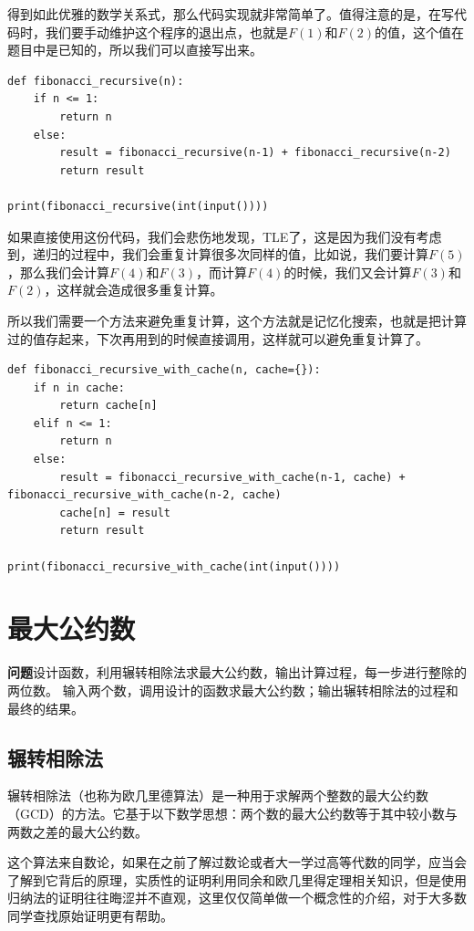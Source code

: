 \documentclass{article}
\begin{document}
得到如此优雅的数学关系式，那么代码实现就非常简单了。值得注意的是，在写代码时，我们要手动维护这个程序的退出点，也就是$F(1)$和$F(2)$的值，这个值在题目中是已知的，所以我们可以直接写出来。

\begin{lstlisting}
def fibonacci_recursive(n):
    if n <= 1:
        return n
    else:
        result = fibonacci_recursive(n-1) + fibonacci_recursive(n-2)
        return result

print(fibonacci_recursive(int(input())))
\end{lstlisting}

如果直接使用这份代码，我们会悲伤地发现，TLE了，这是因为我们没有考虑到，递归的过程中，我们会重复计算很多次同样的值，比如说，我们要计算$F(5)$，那么我们会计算$F(4)$和$F(3)$，而计算$F(4)$的时候，我们又会计算$F(3)$和$F(2)$，这样就会造成很多重复计算。

所以我们需要一个方法来避免重复计算，这个方法就是记忆化搜索，也就是把计算过的值存起来，下次再用到的时候直接调用，这样就可以避免重复计算了。

\begin{lstlisting}
def fibonacci_recursive_with_cache(n, cache={}):
    if n in cache:
        return cache[n]
    elif n <= 1:
        return n
    else:
        result = fibonacci_recursive_with_cache(n-1, cache) + fibonacci_recursive_with_cache(n-2, cache)
        cache[n] = result
        return result

print(fibonacci_recursive_with_cache(int(input())))
\end{lstlisting}

\newpage
\section{最大公约数}
\textbf{问题}\quad 设计函数，利用辗转相除法求最大公约数，输出计算过程，每一步进行整除的两位数。
输入两个数，调用设计的函数求最大公约数；输出辗转相除法的过程和最终的结果。

\subsection{辗转相除法}

辗转相除法（也称为欧几里德算法）是一种用于求解两个整数的最大公约数（GCD）的方法。它基于以下数学思想：两个数的最大公约数等于其中较小数与两数之差的最大公约数。

这个算法来自数论，如果在之前了解过数论或者大一学过高等代数的同学，应当会了解到它背后的原理，实质性的证明利用同余和欧几里得定理相关知识，但是使用归纳法的证明往往晦涩并不直观，这里仅仅简单做一个概念性的介绍，对于大多数同学查找原始证明更有帮助。
\end{document}
